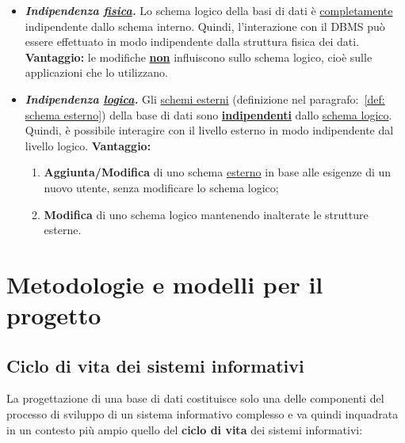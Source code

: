 \documentclass[a4paper]{article}
\begin{document}
	\begin{itemize}
		\item[\ding{42}] \textbf{\emph{Indipendenza \underline{fisica}.}} Lo schema logico della basi di dati è \underline{completamente} indipendente dallo schema interno. Quindi, l'interazione con il DBMS può essere effettuato in modo indipendente dalla struttura fisica dei dati.\newline
		\textcolor{Green4}{\textbf{Vantaggio:}} le modifiche \textbf{\underline{non}} influiscono sullo schema logico, cioè sulle applicazioni che lo utilizzano.
		
		\item[\ding{42}] \textbf{\emph{Indipendenza \underline{logica}.}} Gli \underline{schemi esterni} (definizione nel paragrafo:~\ref{def: schema esterno}) della base di dati sono \textbf{\underline{indipendenti}} dallo \underline{schema logico}. Quindi, è possibile interagire con il livello esterno in modo indipendente dal livello logico.\newline
		\textcolor{Green4}{\textbf{Vantaggio:}}
		\begin{enumerate}[label=\Roman*]
			\item \textbf{Aggiunta/Modifica} di uno schema \underline{esterno} in base alle esigenze di un nuovo utente, senza modificare lo schema logico;
			
			\item \textbf{Modifica} di uno schema logico mantenendo inalterate le strutture esterne.
		\end{enumerate}
	\end{itemize}

	\newpage
	
	


	\section{Metodologie e modelli per il progetto}
	
	\subsection{Ciclo di vita dei sistemi informativi}
	
	La progettazione di una base di dati costituisce solo una delle componenti del processo di sviluppo di un sistema informativo complesso e va quindi inquadrata in un contesto più ampio quello del \textbf{ciclo di vita} dei sistemi informativi:
	
\end{document}

